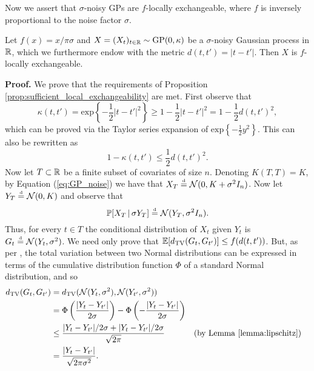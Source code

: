 Now we assert that $\sigma$-noisy GPs are $f$-locally exchangeable, where $f$ is inversely proportional to the noise factor $\sigma$. 

\begin{proposition} \label{prop:GP_local_exchangeability}
	Let $f(x) = x / \pi \sigma$ and $X = (X_t)_{t \in \mathbb{R}} \sim \mathrm{GP} (0, \kappa)$ be a $\sigma$-noisy Gaussian process in $\mathbb{R}$, which we furthermore endow with the metric  $d(t, t') = |t-t'|$. Then $X$ is $f$-locally exchangeable.
\end{proposition}



\textbf{Proof. \hspace{0.05cm}} We prove that the requirements of Proposition \ref{prop:sufficient_local_exchangeability} are met. First observe that
\begin{equation*}
	\kappa(t, t') = \mathrm{exp} \left\{ -\frac{1}{2} |t - t'|^2 \right\} \geq 1 - \frac{1}{2} |t-t'|^2 = 1 - \frac{1}{2} d(t, t')^2,
\end{equation*}
which can be proved via the Taylor series expansion of $\mathrm{exp} \left\{ -\frac{1}{2} y^2 \right\}$. This can also be rewritten as
\begin{equation} \label{eq:kappa_bound}
	1 - \kappa(t, t') \leq \frac{1}{2} d(t, t')^2.
\end{equation}
Now let $T \subset \mathbb{R}$ be a finite subset of covariates of size $n$. Denoting $K(T, T) = K$, by Equation (\ref{eq:GP_noise}) we have that $X_T \stackrel{\text{\rm\tiny d}}{=} \mathcal{N} (0, K + \sigma^2 I_n )$. Now let $Y_T \stackrel{\text{\rm\tiny d}}{=} \mathcal{N}(0, K)$ and observe that
\begin{equation}
	\mathbb{P} [X_T \, | \, \sigma Y_T ] \stackrel{\text{\rm\tiny d}}{=} \mathcal{N}(Y_T, \sigma^2 I_n).
\end{equation}
Thus, for every $t \in T$ the conditional distribution of $X_t$ given $Y_t$ is $G_t \stackrel{\text{\rm\tiny d}}{=} \mathcal{N} (Y_t, \sigma^2)$. We need only prove that $\mathbb{E}[d_{\mathrm{TV}} (G_t , G_{t'} ) ] \leq f(d(t, t'))$. But, as per \cite[][p.~15]{CampbellEtAl:2019:LocalExch}, the total variation between two Normal distributions can be expressed in terms of the cumulative distribution function $\Phi$ of a standard Normal distribution, and so
\begin{align}
	d_{\mathrm{TV}} (G_t , G_{t'} )  &= d_{\mathrm{TV}} (\mathcal{N} (Y_t, \sigma^2) , \mathcal{N} (Y_{t'}, \sigma^2) )   \nonumber \\
		&= \Phi \left( \frac{|Y_t - Y_{t'} |}{2 \sigma} \right) - \Phi \left( -\frac{|Y_t - Y_{t'} |}{2 \sigma} \right) \nonumber \\
		&\leq \frac{|Y_t - Y_{t'} |/2\sigma + |Y_t - Y_{t'} |/2\sigma}{\sqrt{2\pi}} && \text{(by Lemma \ref{lemma:lipschitz})} \nonumber \\
		&= \frac{|Y_t - Y_{t'}|}{\sqrt{2 \pi \sigma^2}}. \label{eq:TV_GP}
\end{align}
